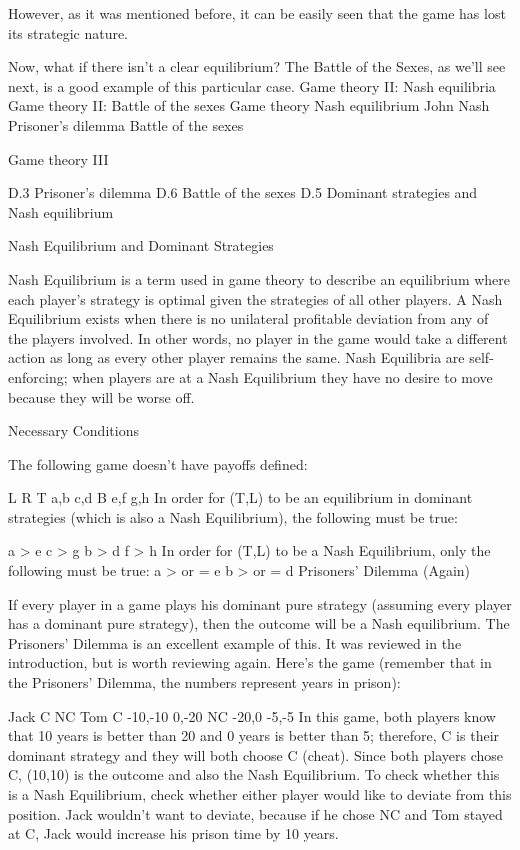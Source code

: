 However, as it was mentioned before, it can be easily seen that the game has lost its strategic nature.

Now, what if there isn’t a clear equilibrium? The Battle of the Sexes, as we’ll see next, is a good example of this particular case.
	Game theory II: Nash equilibria Game theory II: Battle of the sexes 
Game theory
Nash equilibrium
John Nash
Prisoner’s dilemma
Battle of the sexes
 
Game theory III
 
D.3 Prisoner’s dilemma
D.6 Battle of the sexes
D.5 Dominant strategies and Nash equilibrium



Nash Equilibrium and Dominant Strategies

Nash Equilibrium is a term used in game theory to describe an equilibrium where each player's strategy is optimal given the strategies of all other players. A Nash Equilibrium exists when there is no unilateral profitable deviation from any of the players involved. In other words, no player in the game would take a different action as long as every other player remains the same. Nash Equilibria are self-enforcing; when players are at a Nash Equilibrium they have no desire to move because they will be worse off.

Necessary Conditions

The following game doesn't have payoffs defined:

L	R
T	a,b	c,d
B	e,f	g,h
In order for (T,L) to be an equilibrium in dominant strategies (which is also a Nash Equilibrium), the following must be true:

a > e
c > g
b > d
f > h
In order for (T,L) to be a Nash Equilibrium, only the following must be true:
a > or = e
b > or = d
Prisoners' Dilemma (Again)

If every player in a game plays his dominant pure strategy (assuming every player has a dominant pure strategy), then the outcome will be a Nash equilibrium. The Prisoners' Dilemma is an excellent example of this. It was reviewed in the introduction, but is worth reviewing again. Here's the game (remember that in the Prisoners' Dilemma, the numbers represent years in prison):

Jack
C	NC
Tom	C	-10,-10	0,-20
NC	-20,0	-5,-5
In this game, both players know that 10 years is better than 20 and 0 years is better than 5; therefore, C is their dominant strategy and they will both choose C (cheat). Since both players chose C, (10,10) is the outcome and also the Nash Equilibrium. To check whether this is a Nash Equilibrium, check whether either player would like to deviate from this position. Jack wouldn't want to deviate, because if he chose NC and Tom stayed at C, Jack would increase his prison time by 10 years.

